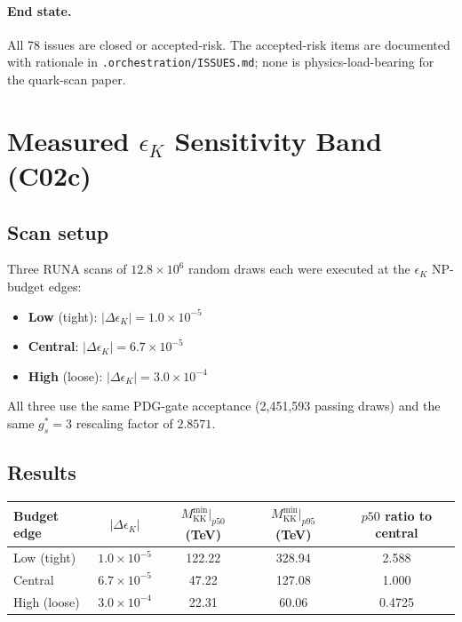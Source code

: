 \documentclass[11pt]{article}
\newcommand{\Mkk}{M_{\mathrm{KK}}}
\newcommand{\gs}{g_s^*}
\newcommand{\eK}{\epsilon_K}
\newcommand{\DeK}{\Delta\eK}
\begin{document}
\paragraph{End state.}
All 78 issues are closed or accepted-risk.  The accepted-risk items
are documented with rationale in
\texttt{.orchestration/ISSUES.md}; none is physics-load-bearing for
the quark-scan paper.


\section{Measured $\eK$ Sensitivity Band (C02c)}
\label{sec:c02c}

\subsection{Scan setup}

Three RUNA scans of $12.8\times10^6$ random draws each were executed
at the $\eK$ NP-budget edges:
\begin{itemize}[nosep]
  \item \textbf{Low} (tight): $|\DeK| = 1.0\times10^{-5}$
  \item \textbf{Central}: $|\DeK| = 6.7\times10^{-5}$
  \item \textbf{High} (loose): $|\DeK| = 3.0\times10^{-4}$
\end{itemize}
All three use the same PDG-gate acceptance (2,451,593 passing draws)
and the same $\gs = 3$ rescaling factor of $2.8571$.

\subsection{Results}

\begin{center}
\begin{tabular}{@{}lcccc@{}}
\toprule
Budget edge & $|\DeK|$ &
  $\Mkk^{\min}|_{p50}$ (TeV) &
  $\Mkk^{\min}|_{p95}$ (TeV) &
  $p50$ ratio to central \\
\midrule
Low (tight) & $1.0\times10^{-5}$ &
  122.22 & 328.94 & 2.588 \\
Central & $6.7\times10^{-5}$ &
  47.22 & 127.08 & 1.000 \\
High (loose) & $3.0\times10^{-4}$ &
  22.31 & 60.06 & 0.4725 \\
\bottomrule
\end{tabular}
\end{center}
\end{document}
